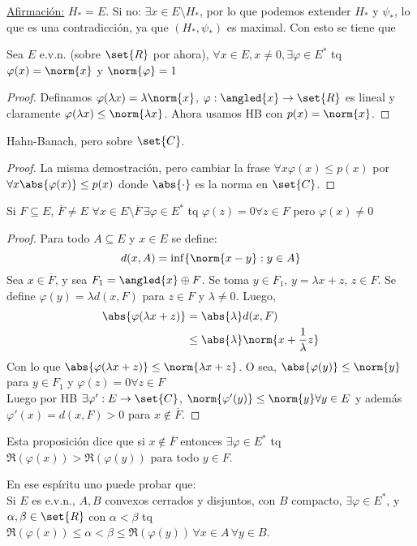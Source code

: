 \documentclass{notetaking}
\begin{document}
\underline{Afirmación:} \(H_*=E\). Si no: \(\exists x\in E\setminus H_*\), por lo que podemos extender \(H_*\) y \(\psi_*\), lo que es una contradicción, ya que \((H_*,\psi_*)\) es maximal. Con esto se tiene que
\begin{cor}
    Sea \(E\) e.v.n. (sobre \(\set{R}\) por ahora), \(\forall x\in E, x\neq0,\exists \varphi\in E^*\) tq \(\varphi(x)=\norm{x}\) y \(\norm{\varphi}=1\)
\end{cor}
\begin{proof}
    Definamos \(\varphi(\lambda x)=\lambda\norm{x}\), \(\varphi:\angled{x}\rightarrow\set{R}\) es lineal y claramente \(\varphi(\lambda x)\leq\norm{\lambda x}\). Ahora usamos HB con \(p(x)=\norm{x}\).
\end{proof}
\begin{thm}
    Hahn-Banach, pero sobre \(\set{C}\).
\end{thm}
\begin{proof}
    La misma demostración, pero cambiar la frase \(\forall x \varphi(x)\leq p(x)\) por \(\forall x\abs{\varphi(x)}\leq p(x)\) donde \(\abs{\cdot}\) es la norma en \(\set{C}\).
\end{proof}

\begin{cor}
    Si \(F\subseteq E\), \(\overline{F}\neq E\) \(\forall x\in E\setminus \overline{F}\,\exists\varphi\in E^*\) tq \(\varphi(z)=0\forall z\in F\) pero \(\varphi(x)\neq 0\)
\end{cor}
\begin{proof}
    Para todo \(A\subseteq E\) y \(x\in E\) se define:
    \[
        d(x,A)=\inf\{\norm{x-y}:y\in A\}
    \]
    Sea \(x\in\overline{F}\), y sea \(F_1=\angled{x}\oplus F\). Se toma \(y\in F_1\), \(y=\lambda x+z\), \(z\in F\). Se define \(\varphi(y)=\lambda d(x,F)\) para \(z\in F\) y \(\lambda\neq 0\). Luego,
    \begin{align*}
        \abs{\varphi(\lambda x+z)} & =\abs{\lambda}d(x,F)                      \\
                                   & \leq\abs{\lambda}\norm{x+\frac1\lambda z}
    \end{align*}
    Con lo que \(\abs{\varphi(\lambda x+z)}\leq\norm{\lambda x+z}\). O sea, \(\abs{\varphi(y)}\leq\norm{y}\) para \(y\in F_1\) y \(\varphi(z)=0\forall z\in F\)\\
    Luego por HB \(\exists\varphi':E\rightarrow\set{C}\), \(\norm{\varphi'(y)}\leq\norm{y}\forall y \in E\) y además \(\varphi'(x)=d(x,F)>0\) para \(x\notin\overline{F}\).
\end{proof}
\begin{obs}
    Esta proposición dice que si \(x\notin\overline{F}\) entonces \(\exists\varphi\in E^*\) tq \(\Re(\varphi(x))>\Re(\varphi(y))\) para todo \(y\in F\).
\end{obs}
En ese espíritu uno puede probar que:\\
Si \(E\) es e.v.n., \(A,B\) convexos cerrados y disjuntos, con \(B\) compacto, \(\exists\varphi\in E^*\), y \(\alpha,\beta\in\set{R}\) con \(\alpha<\beta\) tq \(\Re(\varphi(x))\leq\alpha<\beta\leq\Re(\varphi(y))\,\forall x\in A\,\forall y\in B\).
\end{document}
